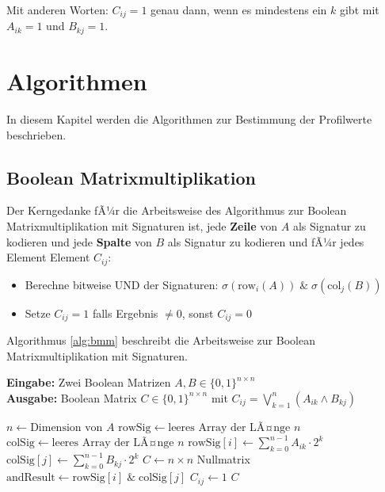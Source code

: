 ﻿\documentclass[a4paper,12pt]{article}
\theoremstyle{definition}
\begin{document}
	Mit anderen Worten: $C_{ij} = 1$ genau dann, wenn es mindestens ein $k$ gibt mit $A_{ik} = 1$ und $B_{kj} = 1$.
	
	\section{Algorithmen}
	
	In diesem Kapitel werden die Algorithmen zur Bestimmung der Profilwerte beschrieben.
	
	\subsection{Boolean Matrixmultiplikation}
	
	Der Kerngedanke fÃ¼r die Arbeitsweise des Algorithmus zur Boolean Matrixmultiplikation mit Signaturen ist, jede \textbf{Zeile} von $A$ als Signatur zu kodieren und jede \textbf{Spalte} von $B$ als Signatur zu kodieren und fÃ¼r jedes Element Element $C_{ij}$:
	\begin{itemize}
		\item[-] Berechne bitweise UND der Signaturen: $\sigma(\text{row}_i(A)) \; \& \; \sigma(\text{col}_j(B))$
		\item[-] Setze $C_{ij} = 1$ falls Ergebnis $\neq 0$, sonst $C_{ij} = 0$
	\end{itemize}
	
	Algorithmus \ref{alg:bmm} beschreibt die Arbeitsweise zur Boolean Matrixmultiplikation mit Signaturen.
	
	\begin{algorithm}[htb]
		\caption{Boolean Matrixmultiplikation mit Signaturen}
		\label{alg:bmm}
		\textbf{Eingabe:} Zwei Boolean Matrizen $A, B \in \{0,1\}^{n \times n}$ \\
		\textbf{Ausgabe:} Boolean Matrix $C \in \{0,1\}^{n \times n}$ mit $C_{ij} = \bigvee_{k=1}^{n} (A_{ik} \wedge B_{kj})$
		\begin{algorithmic}[1]
			\State $n \gets \text{Dimension von } A$
			\State $\text{rowSig} \gets \text{leeres Array der LÃ¤nge } n$
			\State $\text{colSig} \gets \text{leeres Array der LÃ¤nge } n$
			\State $\text{rowSig}[i] \gets \sum_{k=0}^{n-1} A_{ik} \cdot 2^k$ 
			\EndFor
			\State $\text{colSig}[j] \gets \sum_{k=0}^{n-1} B_{kj} \cdot 2^k$ 
			\EndFor
			\State $C \gets n \times n$ Nullmatrix
			\State $\text{andResult} \gets \text{rowSig}[i] \; \& \; \text{colSig}[j]$ 
			\State $C_{ij} \gets 1$
			\EndIf
			\EndFor
			\EndFor    
			\State \Return $C$
		\end{algorithmic}
	\end{algorithm}
	
\end{document}
